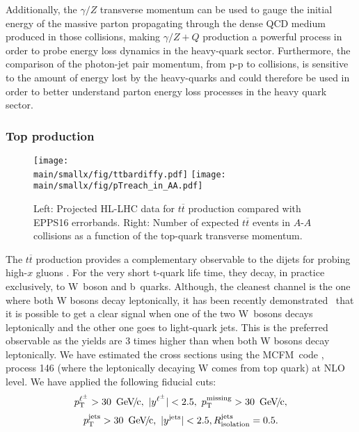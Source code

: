 \documentclass[../report.tex]{subfiles}
\providecommand{\main}{..}
\begin{document}
Additionally, the $\gamma/Z$ transverse momentum can be used to gauge the
initial energy of the massive parton propagating through the dense QCD
medium produced in those collisions, making $\gamma/Z+ Q$ production a
powerful process in order to probe energy loss dynamics in the
heavy-quark sector.  
%
Furthermore, the comparison of the photon-jet pair momentum, from p-p
to \PbPb collisions, is sensitive to the amount of energy lost by the
heavy-quarks and could therefore be used in order to better understand
parton energy loss processes in the heavy quark sector.



\subsubsection{Top production}
\label{sec:nPDF_top}

\begin{figure}[htb!]
\centering
\texttt{[image: \\main/smallx/fig/ttbardiffy.pdf]}
\texttt{[image: \\main/smallx/fig/pTreach\_in\_AA.pdf]}
\caption{Left: Projected HL-LHC data for $t\overline{t}$ production compared with EPPS16 errorbands. Right: Number of expected $t\overline{t}$ events in $A$-$A$ collisions as a function of the top-quark transverse momentum.}
\label{fig:ttbardiffy}
\end{figure}

The $t\overline{t}$ production provides a complementary observable to the dijets for probing high-$x$ gluons \cite{dEnterria:2015mgr,Sirunyan:2017xku}. For the very short t-quark life time, they decay, in practice exclusively, to W~boson and b~quarks. Although, the cleanest channel is the one where both W bosons decay leptonically, it has been recently demonstrated~\cite{Sirunyan:2017xku} that it is possible to get a clear signal when one of the two W~bosons decays leptonically and the other one goes to light-quark jets. This is the preferred observable as the yields are 3 times higher than when both W bosons decay leptonically. We have estimated the cross sections using the MCFM~code \cite{Campbell:2015qma}, process 146 (where the leptonically decaying W comes from top quark) at NLO level. We have applied the following fiducial cuts:
$$ \pT^{\ell^\pm} > 30 \, {\rm \UGeVc}, \ |y^{\ell^\pm}| < 2.5, \ \pT^{\rm missing} > 30 \, {\rm \UGeVc}, $$
$$ p\sb{\scriptstyle\mathrm{T}}^{\rm jets} > 30 \, {\rm ~\text{GeV}\!/\mspace{-2mu}c}, \ |y^{\rm jets}| < 2.5, R_{\rm isolation}^{\rm jets} = 0.5. $$
\end{document}
